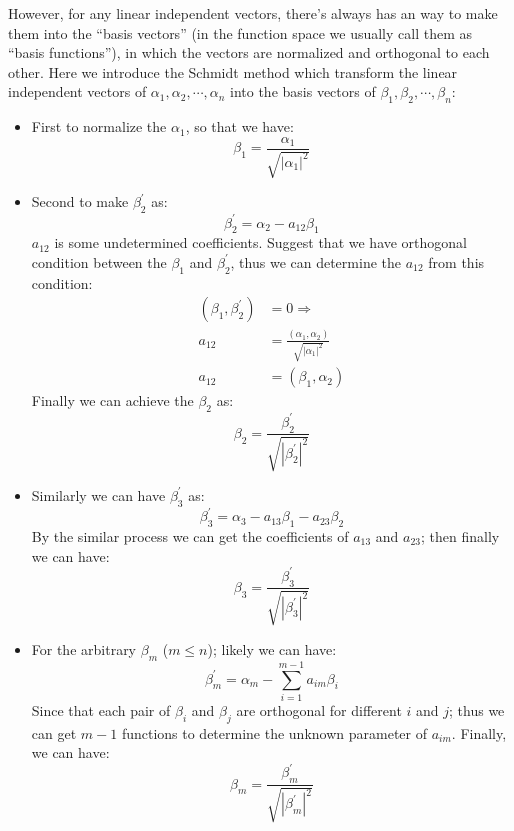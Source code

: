 However, for any linear independent vectors, there's always has an way
to make them into the ``basis vectors'' (in the function space we
usually call them as ``basis functions''), in which the vectors are
normalized and orthogonal to each other. Here we introduce the Schmidt
method which transform the linear independent vectors of $\alpha_{1},
\alpha_{2}, \cdots, \alpha_{n}$ into the basis vectors of $\beta_{1},
\beta_{2}, \cdots, \beta_{n}$:
\begin{itemize}
  \item First to normalize the $\alpha_{1}$, so that we have:
\begin{equation}\label{}
\beta_{1} = \frac{\alpha_{1}}{\sqrt{|\alpha_{1}|^{2}}}
\end{equation}
  \item Second to make $\beta_{2}^{'}$ as:
\begin{equation}\label{}
\beta_{2}^{'} = \alpha_{2} - a_{12}\beta_{1}
\end{equation}
$a_{12}$ is some undetermined coefficients. Suggest that we have
orthogonal condition between the $\beta_{1}$ and $\beta_{2}^{'}$,
thus we can determine the $a_{12}$ from this condition:
\begin{align}\label{}
(\beta_{1}, \beta_{2}^{'}) &= 0 \Rightarrow \nonumber \\
a_{12} &= \frac{(\alpha_{1},\alpha_{2})}{\sqrt{|\alpha_{1}|^{2}}}
\nonumber \\
a_{12} &= (\beta_{1},\alpha_{2})
\end{align}
Finally we can achieve the $\beta_{2}$ as:
\begin{equation}\label{}
\beta_{2} = \frac{\beta_{2}^{'}}{\sqrt{|\beta_{2}^{'}|^{2}}}
\end{equation}
  \item Similarly we can have $\beta_{3}^{'}$ as:
\begin{equation}\label{}
\beta_{3}^{'} = \alpha_{3} - a_{13}\beta_{1} - a_{23}\beta_{2}
\end{equation}
By the similar process we can get the coefficients of $a_{13}$ and
$a_{23}$; then finally we can have:
\begin{equation}\label{}
\beta_{3} = \frac{\beta_{3}^{'}}{\sqrt{|\beta_{3}^{'}|^{2}}}
\end{equation}
\item For the arbitrary $\beta_{m}$ ($m \leq n$); likely we can
have:
\begin{equation}\label{}
\beta_{m}^{'} = \alpha_{m} - \sum_{i=1}^{m-1}a_{im}\beta_{i}
\end{equation}
Since that each pair of $\beta_{i}$ and $\beta_{j}$ are orthogonal
for different $i$ and $j$; thus we can get $m-1$ functions to
determine the unknown parameter of $a_{im}$. Finally, we can have:
\begin{equation}\label{}
\beta_{m} = \frac{\beta_{m}^{'}}{\sqrt{|\beta_{m}^{'}|^{2}}}
\end{equation}
\end{itemize}

